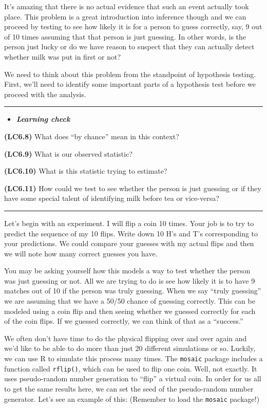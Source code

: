 \documentclass[]{tufte-book}
\newenvironment{rmdblock}[1]
  {\begin{shaded*}
  \begin{itemize}
  \renewcommand{\labelitemi}{
    \raisebox{-.7\height}[0pt][0pt]{
    }
  }
  \item
  }
  {
  \end{itemize}
  \end{shaded*}
  }
\newenvironment{learncheck}
  {\begin{rmdblock}{warning}}
  {\end{rmdblock}}
\begin{document}
It's amazing that there is no actual evidence that such an event
actually took place. This problem is a great introduction into inference
though and we can proceed by testing to see how likely it is for a
person to guess correctly, say, 9 out of 10 times assuming that that
person is just guessing. In other words, is the person just lucky or do
we have reason to suspect that they can actually detect whether milk was
put in first or not?

We need to think about this problem from the standpoint of hypothesis
testing. First, we'll need to identify some important parts of a
hypothesis test before we proceed with the analysis.

\begin{center}\rule{\linewidth}{\linethickness}\end{center}\begin{learncheck}
\textbf{\emph{Learning check}}
\end{learncheck}

\textbf{(LC6.8)} What does ``by chance'' mean in this context?

\textbf{(LC6.9)} What is our observed statistic?

\textbf{(LC6.10)} What is this statistic trying to estimate?

\textbf{(LC6.11)} How could we test to see whether the person is just
guessing or if they have some special talent of identifying milk before
tea or vice-versa?

\begin{center}\rule{\linewidth}{\linethickness}\end{center}

Let's begin with an experiment. I will flip a coin 10 times. Your job is
to try to predict the sequence of my 10 flips. Write down 10 H's and T's
corresponding to your predictions. We could compare your guesses with my
actual flips and then we will note how many correct guesses you have.

You may be asking yourself how this models a way to test whether the
person was just guessing or not. All we are trying to do is see how
likely it is to have 9 matches out of 10 if the person was truly
guessing. When we say ``truly guessing'' we are assuming that we have a
50/50 chance of guessing correctly. This can be modeled using a coin
flip and then seeing whether we guessed correctly for each of the coin
flips. If we guessed correctly, we can think of that as a ``success.''

We often don't have time to do the physical flipping over and over again
and we'd like to be able to do more than just 20 different simulations
or so. Luckily, we can use R to simulate this process many times. The
\texttt{mosaic} package includes a function called \texttt{rflip()},
which can be used to flip one coin. Well, not exactly. It uses
pseudo-random number generation to ``flip'' a virtual coin. In order for
us all to get the same results here, we can set the seed of the
pseudo-random number generator. Let's see an example of this: (Remember
to load the \texttt{mosaic} package!)
\end{document}
